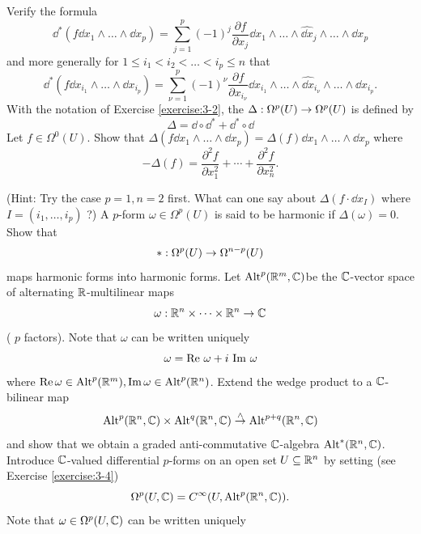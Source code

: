 \begin{enumerate}[\theexercise.1]
    Verify the formula
    \[
      {\dd}^*( {f{\dd}{x}_{1} \land  \ldots  \land  \dd{x}_{p}})  = \sum_{{j = 1}}^{p}{(-1) }^{j}\frac{\partial f}{\partial {x}_{j}}\dd{x}_{1} \land  \ldots  \land  {\widehat{\dd x}}_{j} \land  \ldots  \land \dd{x}_{p}
    \]
    and more generally for $1 \leq  {i}_{1} < {i}_{2} < \ldots  < {i}_{p} \leq  n$ that
    \[
      {\dd}^*( {{f \dd}{x}_{{i}_{1}} \land  \ldots  \land  \dd{x}_{{i}_{p}}})  = \sum_{{\nu  = 1}}^{p}{(-1) }^{\nu }\frac{\partial f}{\partial {x}_{{i}_{\nu }}}\dd{x}_{{i}_{1}} \land  \ldots  \land  {\widehat{\dd x}}_{{i}_{\nu }} \land  \ldots  \land  \dd{x}_{{i}_{p}}.
    \]
  \NewItem With the notation of Exercise \ref{exercise:3-2}, the  $\Delta  : {\Omega }^{p}( U)  \rightarrow  {\Omega }^{p}( U)$ is defined by
    \[
      \Delta  = \dd \circ  {\dd}^* + {\dd}^* \circ  \dd
    \]
    Let $f \in  {\Omega }^{0}( U)$. Show that $\Delta ( {{f\dd}{x}_{1} \land  \ldots  \land  \dd{x}_{p}})  = \Delta ( f) \dd{x}_{1} \land  \ldots  \land  \dd{x}_{p}$
    where
    \[
      - \Delta ( f)  = \frac{{\partial }^{2}f}{\partial {x}_{1}^{2}} + \cdots  + \frac{{\partial }^{2}f}{\partial {x}_{n}^{2}}.
    \]
    \par(Hint: Try the case $p = 1,n = 2$ first. What can one say about $\Delta ( {f \cdot  \dd{x}_{I}})$ where $I = ( {{i}_{1},\ldots,{i}_{p}})$ ?)
    A $p$-form $\omega  \in  {\Omega }^{p}( U)$ is said to be harmonic if $\Delta ( \omega )  = 0$. Show that
    \[
      *  : {\Omega }^{p}( U)  \rightarrow  {\Omega }^{n- p}( U)
    \]
    maps harmonic forms into harmonic forms.
  \NewItem Let ${\operatorname{Alt}}^{p}( {{\mathbb{R}}^{m},\mathbb{C}})$be the $\mathbb{C}$-vector space of alternating $\mathbb{R}$-multilinear maps
    \[
      \omega  : {\mathbb{R}}^{n} \times  \cdots  \times  {\ensuremath{\mathbb{R}}}^{n} \rightarrow  \mathbb{C}
    \]
    ( $p$ factors). Note that $\omega$ can be written uniquely
    \[
      \omega  = \operatorname{Re}\,\omega  + i\,\operatorname{Im}\,\omega
    \]
    where $\operatorname{Re}\omega  \in  {\operatorname{Alt}}^{p}( {\mathbb{R}}^{m}),\operatorname{Im}\omega  \in  {\operatorname{Alt}}^{p}( {\mathbb{R}}^{n})$.
    Extend the wedge product to a $\mathbb{C}$-bilinear map
    \[
      {\operatorname{Alt}}^{p}( {{\mathbb{R}}^{n},\mathbb{C}})  \times  {\operatorname{Alt}}^{q}( {{\mathbb{R}}^{n},\mathbb{C}}) \overset{ \land  }{ \rightarrow  }{\operatorname{Alt}}^{p + q}( {{\mathbb{R}}^{n},\mathbb{C}})
    \]
    and show that we obtain a graded anti-commutative $\mathbb{C}$-algebra ${\operatorname{Alt}}^*( {{\mathbb{R}}^{n},\mathbb{C}})$.
  \NewItem Introduce $\mathbb{C}$-valued differential $p$-forms on an open set $U \subseteq  {\ensuremath{\mathbb{R}}}^{n}$ by setting (see Exercise \ref{exercise:3-4})
    \[
      {\Omega }^{p}( {U,\mathbb{C}})  = {C}^{\infty }( {U,{\operatorname{Alt}}^{p}( {{\mathbb{R}}^{n},\mathbb{C}}) }).
    \]
    Note that $\omega  \in  {\Omega }^{p}( {U,\mathbb{C}})$ can be written uniquely

\end{enumerate}
